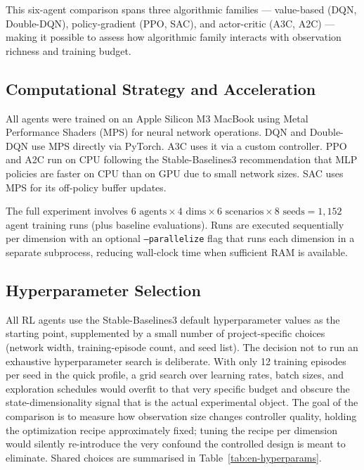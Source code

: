\documentclass[12pt,a4paper]{article}
\begin{document}
This six-agent comparison spans three algorithmic families --- value-based (DQN, Double-DQN), policy-gradient (PPO, SAC), and actor-critic (A3C, A2C) --- making it possible to assess how algorithmic family interacts with observation richness and training budget.

\subsection{Computational Strategy and Acceleration}

All agents were trained on an Apple Silicon M3 MacBook using Metal Performance
Shaders (MPS) for neural network operations. DQN and Double-DQN use MPS directly
via PyTorch. A3C uses it via a custom controller. PPO and A2C run on CPU following
the Stable-Baselines3 recommendation that MLP policies are faster on CPU than on
GPU due to small network sizes. SAC uses MPS for its off-policy buffer updates.

The full experiment involves $6 \text{ agents} \times 4 \text{ dims} \times 6
    \text{ scenarios} \times 8 \text{ seeds} = 1{,}152$ agent training runs (plus
baseline evaluations). Runs are executed sequentially per dimension with an optional
\texttt{--parallelize} flag that runs each dimension in a separate subprocess,
reducing wall-clock time when sufficient RAM is available.

\subsection{Hyperparameter Selection}
\label{sec:hyperparameters}

All RL agents use the Stable-Baselines3 default hyperparameter values as the starting point, supplemented by a small number of project-specific choices (network width, training-episode count, and seed list). The decision not to run an exhaustive hyperparameter search is deliberate. With only 12 training episodes per seed in the quick profile, a grid search over learning rates, batch sizes, and exploration schedules would overfit to that very specific budget and obscure the state-dimensionality signal that is the actual experimental object. The goal of the comparison is to measure how observation size changes controller quality, holding the optimization recipe approximately fixed; tuning the recipe per dimension would silently re-introduce the very confound the controlled design is meant to eliminate. Shared choices are summarised in Table~\ref{tab:en-hyperparams}.
\end{document}
